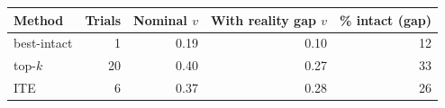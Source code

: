 \begin{tabular}{lrrrr}
\toprule
Method & Trials & Nominal $v$ & With reality gap $v$ & \% intact (gap) \\
\midrule
best-intact & 1 & 0.19 & 0.10 & 12 \\
top-$k$ & 20 & 0.40 & 0.27 & 33 \\
ITE & 6 & 0.37 & 0.28 & 26 \\
\bottomrule
\end{tabular}
